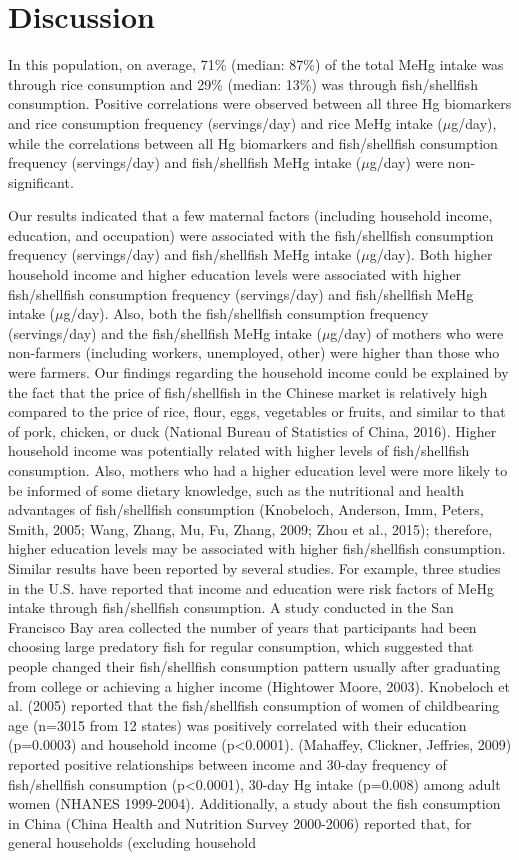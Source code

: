 \section{Discussion} 

In this population, on average, 71\% (median: 87\%) of the total MeHg intake was through rice consumption and 29\% (median: 13\%) was through fish/shellfish consumption. Positive correlations were observed between all three Hg biomarkers and rice consumption frequency (servings/day) and rice MeHg intake (\({\mu}\)g/day), while the correlations between all Hg biomarkers and fish/shellfish consumption frequency (servings/day) and fish/shellfish MeHg intake (\({\mu}\)g/day) were non-significant.

Our results indicated that a few maternal factors (including household income, education, and occupation) were associated with the fish/shellfish consumption frequency (servings/day) and fish/shellfish MeHg intake (\({\mu}\)g/day). Both higher household income and higher education levels were associated with higher fish/shellfish consumption frequency (servings/day) and fish/shellfish MeHg intake (\({\mu}\)g/day). Also, both the fish/shellfish consumption frequency (servings/day) and the fish/shellfish MeHg intake (\({\mu}\)g/day) of mothers who were non-farmers (including workers, unemployed, other) were higher than those who were farmers. Our findings regarding the household income could be explained by the fact that the price of fish/shellfish in the Chinese market is relatively high compared to the price of rice, flour, eggs, vegetables or fruits, and similar to that of pork, chicken, or duck (National Bureau of Statistics of China, 2016). Higher household income was potentially related with higher levels of fish/shellfish consumption. Also, mothers who had a higher education level were more likely to be informed of some dietary knowledge, such as the nutritional and health advantages of fish/shellfish consumption (Knobeloch, Anderson, Imm, Peters,  Smith, 2005; Wang, Zhang, Mu, Fu,  Zhang, 2009; Zhou et al., 2015); therefore, higher education levels may be associated with higher fish/shellfish consumption. Similar results have been reported by several studies. For example, three studies in the U.S. have reported that income and education were risk factors of MeHg intake through fish/shellfish consumption. A study conducted in the San Francisco Bay area collected the number of years that participants had been choosing large predatory fish for regular consumption, which suggested that people changed their fish/shellfish consumption pattern usually after graduating from college or achieving a higher income (Hightower  Moore, 2003). Knobeloch et al. (2005) reported that the fish/shellfish consumption of women of childbearing age (n=3015 from 12 states) was positively correlated with their education (p=0.0003) and household income (p<0.0001). (Mahaffey, Clickner,  Jeffries, 2009) reported positive relationships between income and 30-day frequency of fish/shellfish consumption (p<0.0001), 30-day Hg intake (p=0.008) among adult women (NHANES 1999-2004). Additionally, a study about the fish consumption in China (China Health and Nutrition Survey 2000-2006) reported that, for general households (excluding household 